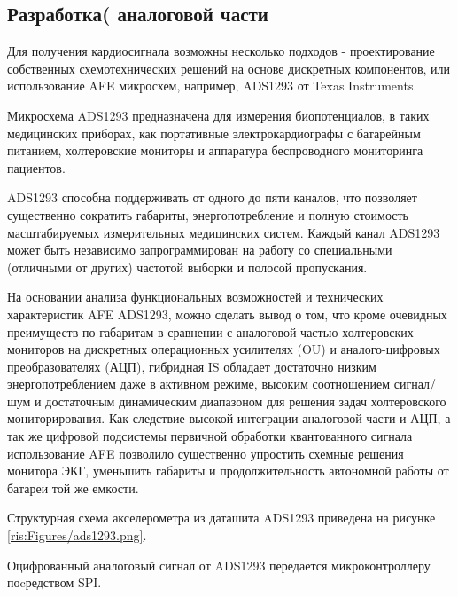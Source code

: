 \subsection{Разработка( аналоговой части}

Для получения кардиосигнала возможны несколько подходов - проектирование собственных схемотехнических решений на основе дискретных компонентов, или использование \acf{AFE} микросхем, например, ADS1293  от Texas Instruments.

Микросхема ADS1293 предназначена для измерения биопотенциалов, в таких медицинских приборах, как портативные электрокардиографы с батарейным питанием, холтеровские мониторы и аппаратура беспроводного мониторинга пациентов. \cite{ADS1293}

ADS1293 способна поддерживать от одного до пяти каналов, что позволяет существенно сократить габариты, энергопотребление и полную стоимость масштабируемых измерительных медицинских систем. Каждый канал ADS1293 может быть независимо запрограммирован на работу со специальными (отличными от других) частотой выборки и полосой пропускания. 

На основании анализа функциональных возможностей и технических характеристик \ac{AFE} ADS1293, можно сделать вывод о том, что кроме очевидных преимуществ по габаритам в сравнении с аналоговой частью холтеровских мониторов на дискретных операционных усилителях (\acs{OU}) и аналого-цифровых преобразователях (\acs{АЦП}), гибридная \ac{IS} обладает достаточно низким энергопотреблением даже в активном режиме, высоким соотношением сигнал/шум и достаточным динамическим диапазоном для решения задач холтеровского мониторирования. Как следствие высокой интеграции аналоговой части и \ac{АЦП}, а так же цифровой подсистемы первичной обработки квантованного сигнала использование \ac{AFE} позволило существенно упростить схемные решения монитора \acs{ЭКГ}, уменьшить габариты и продолжительность автономной работы от батареи той же емкости. 





Структурная схема акселерометра из даташита ADS1293 \cite{DS1293} приведена на рисунке \ref{ris:Figures/ads1293.png}.


Оцифрованный аналоговый сигнал от ADS1293 передается микроконтроллеру поcредством \acf{SPI}.



